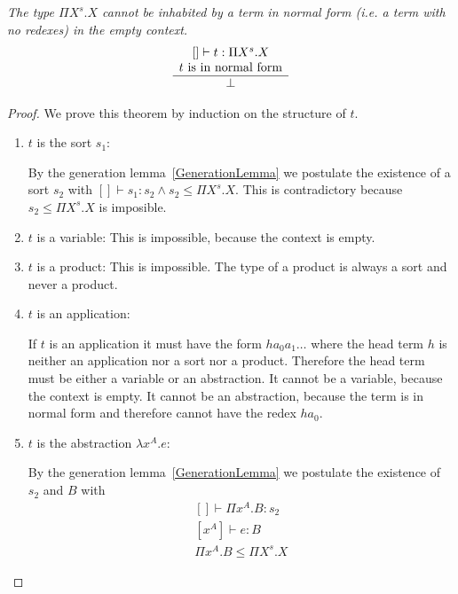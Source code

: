 \begin{theorem}
    \emph{The type $\Pi X^s. X$ cannot be inhabited by a term in normal form
    (i.e. a term with no redexes) in the empty context.}
    $$
    \begin{array}{c} 
        [] \vdash t: \Pi X^s. X
        \\
        t \text{ is in normal form}
     \\ \hline 
        \perp
    \end{array}
    $$

    \begin{proof}
        We prove this theorem by induction on the structure of $t$.
        \begin{enumerate}
        \item $t$ is the sort $s_1$:

            By the generation lemma~\ref{GenerationLemma} we postulate the
                existence of a sort $s_2$ with $[] \vdash s_1: s_2 \land s_2 \le
                \Pi X^s. X$. This is
                contradictory because $s_2 \le \Pi X^s.X$ is imposible.

        \item $t$ is a variable:
            This is impossible, because the context is empty.

        \item $t$ is a product:
            This is impossible. The type of a product is always a sort and never
                a product.

        \item $t$ is an application:

            If $t$ is an application it must have the form $h a_0 a_1 \ldots$
                where the head term $h$ is neither an application nor a sort nor
                a product. Therefore the head term must be either a variable or
                an abstraction. It cannot be a variable, because the context is
                empty. It cannot be an abstraction, because the term is in
                normal form and therefore cannot have the redex $h a_0$.

        \item $t$ is the abstraction $\lambda x^A. e$:

            By the generation lemma~\ref{GenerationLemma} we postulate the
                existence of $s_2$ and $B$ with
                $$
                \begin{array}{l}
                    [] \vdash \Pi x^A. B: s_2
                    \\
                    \text{$[x^A]$} \vdash e: B
                    \\
                    \Pi x^A. B \le \Pi X^s. X
                \end{array}
                $$


\end{enumerate}
\end{proof}
\end{theorem}
